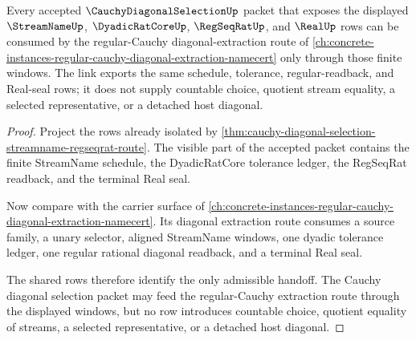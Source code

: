 \begin{theorem}
\label{thm:cauchy-diagonal-selection-regular-diagonal-extraction-link}
Every accepted $\CauchyDiagonalSelectionUp$ packet that exposes the displayed $\StreamNameUp$, $\DyadicRatCoreUp$, $\RegSeqRatUp$, and $\RealUp$ rows can be consumed by the regular-Cauchy diagonal-extraction route of \autoref{ch:concrete-instances-regular-cauchy-diagonal-extraction-namecert} only through those finite windows. The link exports the same schedule, tolerance, regular-readback, and Real-seal rows; it does not supply countable choice, quotient stream equality, a selected representative, or a detached host diagonal.
\end{theorem}
\begin{proof}
Project the rows already isolated by \autoref{thm:cauchy-diagonal-selection-streamname-regseqrat-route}. The visible part of the accepted packet contains the finite StreamName schedule, the DyadicRatCore tolerance ledger, the RegSeqRat readback, and the terminal Real seal.

Now compare with the carrier surface of \autoref{ch:concrete-instances-regular-cauchy-diagonal-extraction-namecert}. Its diagonal extraction route consumes a source family, a unary selector, aligned StreamName windows, one dyadic tolerance ledger, one regular rational diagonal readback, and a terminal Real seal.

The shared rows therefore identify the only admissible handoff. The Cauchy diagonal selection packet may feed the regular-Cauchy extraction route through the displayed windows, but no row introduces countable choice, quotient equality of streams, a selected representative, or a detached host diagonal.
\end{proof}
